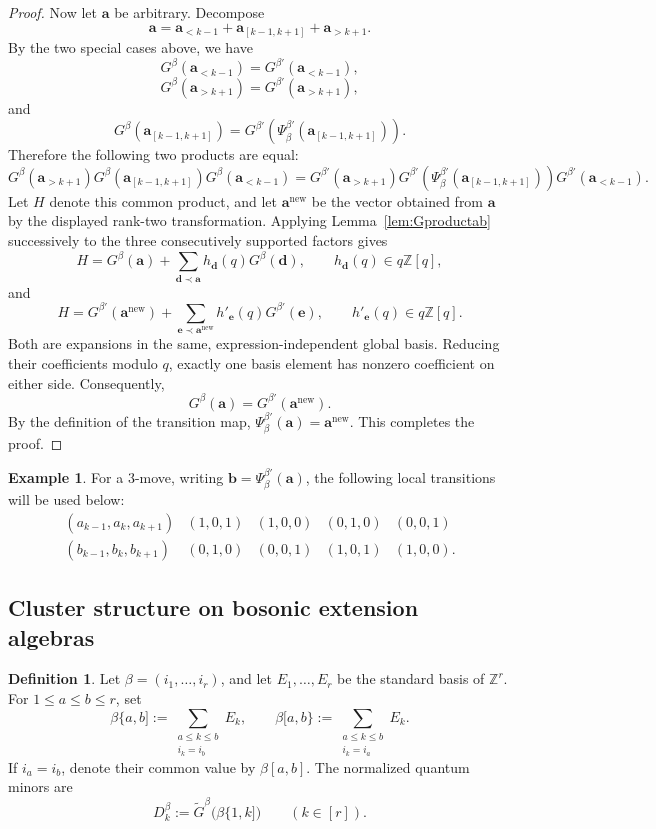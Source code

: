 \documentclass[12pt, reqno]{amsart}
\theoremstyle{plain}
\theoremstyle{definition}
\newtheorem{definition}[theorem]{Definition}
\newtheorem{example}[theorem]{Example}
\numberwithin{equation}{section}
\begin{document}
\begin{proof}
Now let \(\mathbf a\) be arbitrary. Decompose
\[
\mathbf a
=
\mathbf a_{<k-1}
+
\mathbf a_{[k-1,k+1]}
+
\mathbf a_{>k+1}.
\]
By the two special cases above, we have
\[
G^\beta(\mathbf a_{<k-1})
=
G^{\beta'}(\mathbf a_{<k-1}),
\]
\[
G^\beta(\mathbf a_{>k+1})
=
G^{\beta'}(\mathbf a_{>k+1}),
\]
and
\[
G^\beta(\mathbf a_{[k-1,k+1]})
=
G^{\beta'}\!\left(
\Psi_\beta^{\beta'}(\mathbf a_{[k-1,k+1]})
\right).
\]
Therefore the following two products are equal:
\[
G^\beta(\mathbf a_{>k+1})
G^\beta(\mathbf a_{[k-1,k+1]})
G^\beta(\mathbf a_{<k-1})
=
G^{\beta'}(\mathbf a_{>k+1})
G^{\beta'}\!\left(
\Psi_\beta^{\beta'}(\mathbf a_{[k-1,k+1]})
\right)
G^{\beta'}(\mathbf a_{<k-1}).
\]
Let $H$ denote this common product, and let $\mathbf a^{\mathrm{new}}$
be the vector obtained from $\mathbf a$ by the displayed rank-two
transformation. Applying Lemma~\ref{lem:Gproductab} successively to the
three consecutively supported factors gives
\[
    H=G^\beta(\mathbf a)
       +\sum_{\mathbf d\prec\mathbf a}
         h_{\mathbf d}(q)G^\beta(\mathbf d),
    \qquad h_{\mathbf d}(q)\in q\mathbb Z[q],
\]
and
\[
    H=G^{\beta'}(\mathbf a^{\mathrm{new}})
       +\sum_{\mathbf e\prec\mathbf a^{\mathrm{new}}}
         h'_{\mathbf e}(q)G^{\beta'}(\mathbf e),
    \qquad h'_{\mathbf e}(q)\in q\mathbb Z[q].
\]
Both are expansions in the same, expression-independent global basis.
Reducing their coefficients modulo $q$, exactly one basis element has
nonzero coefficient on either side. Consequently,
\[
    G^\beta(\mathbf a)=G^{\beta'}(\mathbf a^{\mathrm{new}}).
\]
By the definition of the transition map,
$\Psi_\beta^{\beta'}(\mathbf a)=\mathbf a^{\mathrm{new}}$.
This completes the proof.
\end{proof}
\begin{example}\label{exm:010}
For a $3$-move, writing $\mathbf b=\Psi_\beta^{\beta'}(\mathbf a)$,
the following local transitions will be used below:
\[
\begin{array}{c|cccc}
 (a_{k-1},a_k,a_{k+1})&(1,0,1)&(1,0,0)&(0,1,0)&(0,0,1)\\
 \hline
 (b_{k-1},b_k,b_{k+1})&(0,1,0)&(0,0,1)&(1,0,1)&(1,0,0).
\end{array}
\]
\end{example}

\subsection{Cluster structure on bosonic extension algebras}
\begin{definition}
Let $\beta=(i_1,\ldots,i_r)$, and let $E_1,\ldots,E_r$ be the standard
basis of $\mathbb Z^r$. For $1\leq a\leq b\leq r$, set
\[
    \beta\{a,b]:=\sum_{\substack{a\leq k\leq b\\i_k=i_b}}E_k,
    \qquad
    \beta[a,b\}:=\sum_{\substack{a\leq k\leq b\\i_k=i_a}}E_k.
\]
If $i_a=i_b$, denote their common value by $\beta[a,b]$.
The normalized quantum minors are
\[
    D_k^\beta:=\widetilde G^\beta\bigl(\beta\{1,k]\bigr)
    \qquad(k\in[r]).
\]
\end{definition}
\end{document}
